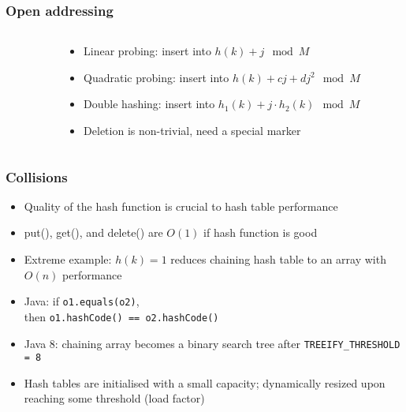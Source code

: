 \documentclass{beamer}
\begin{document}
\begin{frame}
 \frametitle{Open addressing}
  \begin{columns}[t]
   \begin{column}{0.3\textwidth}
   \begin{center}
   \scalebox{0.7} {
   }
   \end{center}
   \end{column}
   \begin{column}{0.7\textwidth}
    \begin{itemize}
     \item Linear probing: insert into $h(k) + j \mod M$
     \item Quadratic probing: insert into $h(k) + cj + dj^2 \mod M$
     \item Double hashing: insert into $h_1(k) + j \cdot h_2(k) \mod M$
     \item Deletion is non-trivial, need a special marker
    \end{itemize}
   \end{column}
  \end{columns}
\end{frame}

\begin{frame}
 \frametitle{Collisions}
 \begin{itemize}
  \item Quality of the hash function is crucial to hash table
        performance
  \item put(), get(), and delete() are $O(1)$ if hash function is good
  \item Extreme example: $h(k) = 1$ reduces chaining hash table to an
        array with $O(n)$ performance
  \item Java: if \texttt{o1.equals(o2)}, \\
        then \texttt{o1.hashCode() == o2.hashCode()}
  \item Java 8: chaining array becomes a binary search tree after
        \texttt{TREEIFY\_THRESHOLD = 8}
  \item Hash tables are initialised with a small capacity; dynamically
        resized upon reaching some threshold (load factor)
 \end{itemize}
\end{frame}
\end{document}
